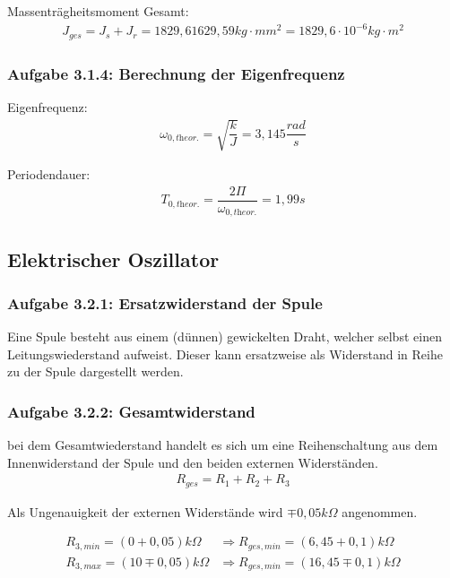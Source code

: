 \documentclass[a4paper]{scrartcl}
\numberwithin{equation}{subsection}
\begin{document}
Massenträgheitsmoment Gesamt:
\begin{align}
J_{ges} = J_{s} + J_{r} = 1829,6 1629,59 kg \cdot mm^2 = 1829,6 \cdot 10^{-6} kg \cdot m^2
\end{align}
	
\subsubsection{Aufgabe 3.1.4: Berechnung der Eigenfrequenz}

Eigenfrequenz:
\begin{align}
\omega_{0,\textit{theor.}} = \sqrt{\dfrac{k}{J}} = 3,145 \dfrac{rad}{s}
\end{align}

Periodendauer:
\begin{align}
T_{0,\textit{theor.}} = \dfrac{2\Pi}{\omega_{0,\textit{theor.}}} = 1,99s
\end{align}

\subsection{Elektrischer Oszillator}
\subsubsection{Aufgabe 3.2.1: Ersatzwiderstand der Spule}

Eine Spule besteht aus einem (dünnen) gewickelten Draht, welcher selbst einen Leitungswiederstand aufweist.
Dieser kann ersatzweise als Widerstand in Reihe zu der Spule dargestellt werden.

\subsubsection{Aufgabe 3.2.2: Gesamtwiderstand}

bei dem Gesamtwiederstand handelt es sich um eine Reihenschaltung aus dem Innenwiderstand der Spule und den beiden externen Widerständen. 
\begin{align}
R_{ges} = R_1 + R_2 + R_3
\end{align}

Als Ungenauigkeit der externen Widerstände wird $\mp 0,05 k \Omega$ angenommen.

\begin{align*}
R_{3,min} = (0+0,05)k\Omega &\Rightarrow R_{ges,min} = (6,45+0,1)k\Omega \\
R_{3,max} = (10\mp0,05)k\Omega &\Rightarrow R_{ges,min} = (16,45\mp0,1)k\Omega
\end{align*}
\end{document}
